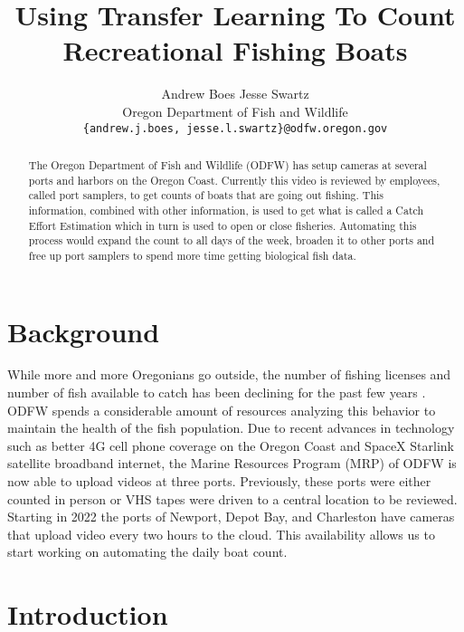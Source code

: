 \documentclass[10pt,twocolumn,letterpaper]{article}
\begin{document}
\title{ Using Transfer Learning To Count Recreational Fishing Boats }

\author{Andrew Boes \hspace{30pt} Jesse Swartz \\
Oregon Department of Fish and Wildlife\\
{\tt\small \{andrew.j.boes, jesse.l.swartz\}@odfw.oregon.gov}
}
\maketitle

\begin{abstract}
   The Oregon Department of Fish and Wildlife (ODFW) has setup cameras at several ports and harbors on the Oregon Coast. Currently this video is reviewed by employees, called port samplers, to get counts of boats that are going out fishing. This information, combined with other information, is used to get what is called a Catch Effort Estimation which in turn is used to open or close fisheries. Automating this process would expand the count to all days of the week, broaden it to other ports and free up port samplers to spend more time getting biological fish data.
\end{abstract}

\section{Background}

While more and more Oregonians go outside, the number of fishing licenses and number of fish available to catch has been declining for the past few years \cite{ODFW_Annual}. ODFW spends a considerable amount of resources analyzing this behavior to maintain the health of the fish population. Due to recent advances in technology such as better 4G cell phone coverage on the Oregon Coast and SpaceX Starlink satellite broadband internet, the Marine Resources Program (MRP) of ODFW is now able to upload videos at three ports. Previously, these ports were either counted in person or VHS tapes were driven to a central location to be reviewed. Starting in 2022 the ports of Newport, Depot Bay, and Charleston have cameras that upload video every two hours to the cloud. This availability allows us to start working on automating the daily boat count.\\[-5pt]

\section{Introduction}
\end{document}
